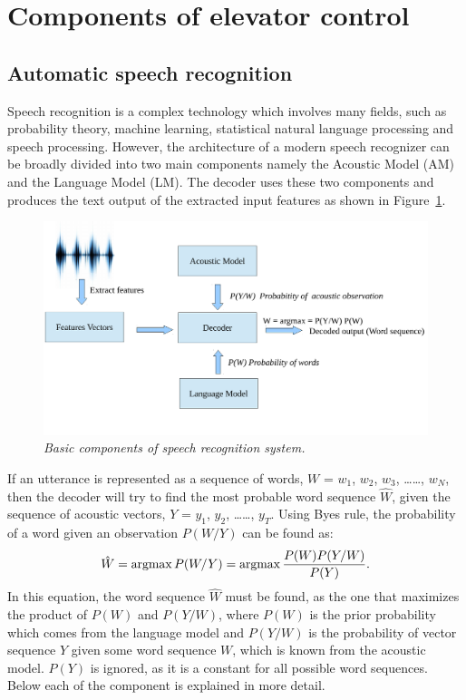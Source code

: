 \documentclass[a4paper, 12pt]{article}
\newcommand{\argmax}{\operatornamewithlimits{argmax}}
\begin{document}
\newpage
\section{Components of elevator control}
\label{sec:Components_of_elevator_control}

\subsection{Automatic speech recognition}
Speech recognition is a complex technology which involves many fields, such as probability theory, machine learning, statistical natural language processing and speech processing. However, the architecture of a modern speech recognizer can be broadly divided into two main components namely the Acoustic Model (AM) and the Language Model (LM). The decoder uses these two components and produces the text output of the extracted input features as shown in Figure~\ref{fig:asr_component1}.
\begin{figure}[ht]
\centering
\includegraphics[width=\textwidth]{ASR_Component1.pdf}
\vspace{-1.2cm}
\caption{\textit{Basic components of speech recognition system.}}
\label{fig:asr_component1}
\end{figure}


If an utterance is represented as a sequence of words, $W$ = $w_1$, $w_2$, $w_3$, \dots \dots, $w_N$, then the decoder will try to find the most probable word sequence $\hat{W}$, given the sequence of acoustic vectors, $Y$ = $y_1$, $y_2$, \dots \dots, $y_T$. Using Byes rule, the probability of a word given an observation $P(W/Y)$ can be found as:
\begin{equation}
\label{equ:bayes_rule}
\hat{W} = \argmax P(W/Y) = \argmax\frac{P(W)P(Y/W)}{P(Y)}.
\end{equation}
In this equation, the word sequence $\hat{W}$ must be found, as the one that maximizes the product of $P(W)$ and $P(Y/W)$, where $P(W)$ is the prior probability which comes from the language model and $P(Y/W)$ is the probability of vector sequence $Y$ given some word sequence $W$, which is known from the acoustic model. $P(Y)$ is ignored, as it is a constant for all possible word sequences. Below each of the component is explained in more detail.
\end{document}
